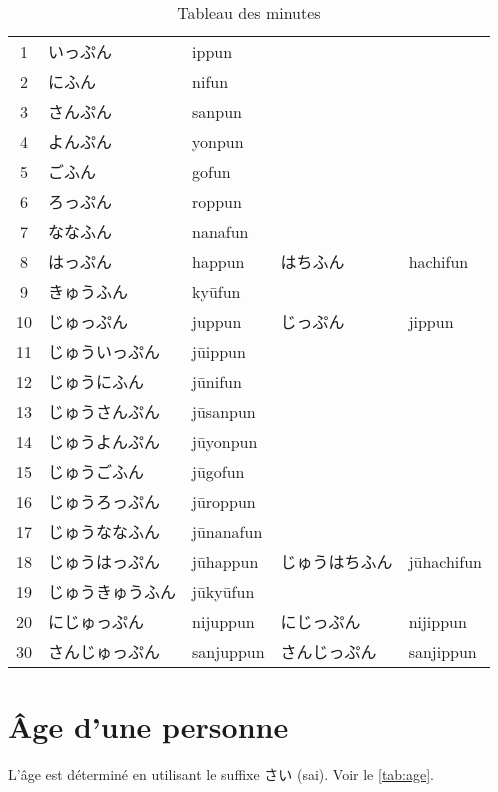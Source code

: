 \documentclass[a4paper,10pt,french,openany]{memoir}
\begin{document}
\begin{table}[htbp]
 \centering
 \begin{tabular}{cllll}
  1 & いっぷん　　　　&ippun\\
  2 & にふん　　　　　&nifun\\
  3 & さんぷん　　　　&sanpun\\
  4 & よんぷん　　　　&yonpun\\
  5 & ごふん　　　　　&gofun\\
  6 & ろっぷん　　　　&roppun\\
  7 & ななふん　　　　&nanafun\\
  8 & はっぷん　　　　&happun & はちふん & hachifun\\
  9 & きゅうふん　　　&kyūfun\\
  10& じゅっぷん　　　&juppun & じっぷん & jippun\\
  11& じゅういっぷん  &jūippun\\
  12& じゅうにふん　　&jūnifun\\
  13& じゅうさんぷん　&jūsanpun\\
  14& じゅうよんぷん　&jūyonpun\\
  15& じゅうごふん　　&jūgofun\\
  16& じゅうろっぷん　&jūroppun\\
  17& じゅうななふん　&jūnanafun\\
  18& じゅうはっぷん　&jūhappun & じゅうはちふん & jūhachifun\\
  19& じゅうきゅうふん&jūkyūfun\\
  20& にじゅっぷん　　&nijuppun & にじっぷん & nijippun\\
  30& さんじゅっぷん　&sanjuppun & さんじっぷん & sanjippun\\
 \end{tabular}
 \caption{Tableau des minutes}
 \label{tab:minutes}
\end{table}

\section{Âge d'une personne}

L'âge est déterminé en utilisant le suffixe さい (sai). Voir le \autoref{tab:age}.
\end{document}

